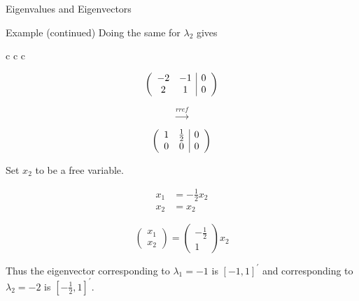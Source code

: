 \documentclass[11pt, xcolor={dvipsnames}, hyperref={colorlinks, allcolors=Blue}]{beamer}
\begin{document}
\begin{frame}{Eigenvalues and Eigenvectors}
\begin{block}{Example (continued)}
Doing the same for $\lambda_2$ gives
\begin{center}
\begin{tabular}{c  c c}
\begin{minipage}{0.2\textwidth}
\[
\left ( 
\begin{array}{c c | c}
-2 & -1 & 0\\ 2 & 1 & 0
\end{array} \right )
\]
\end{minipage}
\quad
\begin{minipage}{0.1\textwidth}
\[ \overset{rref}{\rightarrow}\]
\end{minipage}
\begin{minipage}{0.2\textwidth}
\[
\left ( 
\begin{array}{c c | c}
1 & \frac{1}{2} & 0\\ 0 & 0 & 0
\end{array} \right )
\]
\end{minipage}

\end{tabular}
\end{center}

Set $x_2$ to be a free variable.

\begin{center}
\begin{minipage}{0.3\textwidth}
\begin{align*}
x_1 &= -\frac{1}{2}x_2\\
x_2 &=x_2
\end{align*}
\end{minipage}
\quad 
\begin{minipage}{0.3\textwidth}
\[
\begin{pmatrix} x_1 \\ x_2 \end{pmatrix}
=
\begin{pmatrix} -\frac{1}{2} \\ 1\end{pmatrix}x_2
\]
\end{minipage}
\end{center}


Thus the eigenvector corresponding to $\lambda_1 = -1$ is $[-1, 1]^{\prime}$ and corresponding to $\lambda_2 = -2$ is $[-\frac{1}{2}, 1]^{\prime}$.
\end{block}


\end{frame}
\end{document}
